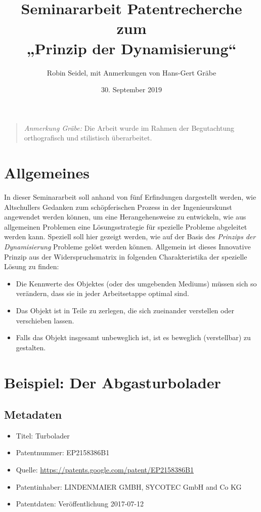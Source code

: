 \documentclass[11pt,a4paper]{article}
\title{Seminararbeit Patentrecherche zum\\ „Prinzip der Dynamisierung“}
\author{Robin Seidel, mit Anmerkungen von Hans-Gert Gräbe}
\date{30. September 2019}
\newcommand{\HGG}[1]{\begin{quote} \emph{Anmerkung Gräbe:} #1  \end{quote}}
\begin{document}
\maketitle

\HGG{Die Arbeit wurde im Rahmen der Begutachtung orthografisch und
stilistisch überarbeitet.}

\section{Allgemeines}
In dieser Seminararbeit soll anhand von fünf Erfindungen dargestellt werden,
wie Altschullers Gedanken zum schöpferischen Prozess in der Ingenieurskunst
angewendet werden können, um eine Herangehensweise zu entwickeln, wie aus
allgemeinen Problemen eine Lösungsstrategie für spezielle Probleme abgeleitet
werden kann.  Speziell soll hier gezeigt werden, wie auf der Basis des
\emph{Prinzips der Dynamisierung} Probleme gelöst werden können. Allgemein ist
dieses Innovative Prinzip aus der Widerspruchsmatrix in folgenden
Charakteristika der spezielle Lösung zu finden:
\begin{itemize}
\item
Die Kennwerte des Objektes (oder des umgebenden Mediums) müssen sich so
verändern, dass sie in jeder Arbeitsetappe optimal sind.
\item
Das Objekt ist in Teile zu zerlegen, die sich zueinander verstellen oder
verschieben lassen.
\item 
Falls das Objekt insgesamt unbeweglich ist, ist es beweglich (verstellbar) zu
gestalten.
\end{itemize}

\section{Beispiel: Der Abgasturbolader}

\subsection{Metadaten}
\begin{itemize}\itemsep0pt
\item Titel: Turbolader
\item Patentnummer: EP2158386B1
\item Quelle: \url{https://patents.google.com/patent/EP2158386B1}
\item Patentinhaber: LINDENMAIER GMBH, SYCOTEC GmbH and Co KG
\item Patentdaten: Veröffentlichung 2017-07-12
\end{itemize}
\end{document}
